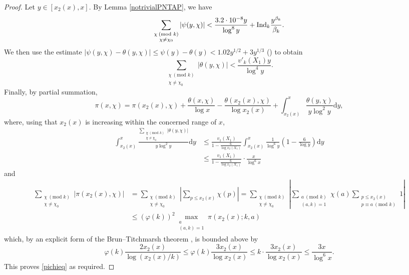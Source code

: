 \documentclass[12pt]{amsart}
\begin{document}
\begin{proof}
Let $y\in [x_2(x),x]$. By Lemma \ref{notrivialPNTAP}, we have
\begin{equation*}
    \sum_{\substack{\chi\: (\text{mod }k) \\ \chi \ne \chi_0}} \left|\psi(y,\chi)\right|<\frac{3.2\cdot 10^{-8}y}{\log^{8} y}+\textnormal{Ind}_k \frac{y^{\beta_k}}{\beta_k}.
\end{equation*}
We then use the estimate $\left|\psi(y, \chi)-\theta(y, \chi)\right|\le \psi(y)-\theta(y)<1.02y^{1/2}+3y^{1/3}$ (\cite[(3.39)]{R-S}) to obtain 
\begin{equation*}
    \sum_{\substack{\chi\: (\text{mod }k) \\ \chi \ne \chi_0}}\left|\theta(y,\chi)\right|<  \frac{v'_k(X_1)y}{\log^{4} y}.
\end{equation*}
Finally, by partial summation,
\begin{equation*}
\pi(x, \chi)=\pi(x_2(x), \chi)+\frac{\theta(x, \chi)}{\log x}-\frac{\theta(x_2(x), \chi)}{\log x_2(x)}+\int_{x_2(x)}^{x} \frac{\theta(y, \chi)}{y\log^2 y}\mathrm{d}y,
\end{equation*}
where,  using that $x_2(x)$ is increasing within the concerned range of $x$,
\begin{align*}
\int_{x_2(x)}^{x} \frac{\sum_{\substack{\chi\: (\text{mod }k) \\ \chi \ne \chi_0}}\left|\theta(y,\chi)\right|}{y\log^2 y}\mathrm{d}y & \le \frac{v_1(X_1)}{1-\frac{6}{\log x_2(X_1)}}\int_{x_2(x)}^{x}\frac{1}{\log^6 y}\left(1-\frac{6}{\log y}\right)\mathrm{d}y\\ &\le\frac{v_1(X_1)}{1-\frac{6}{\log x_2(X_1)}}\cdot\frac{x}{\log^6 x}
\end{align*}
and
\begin{align*}
    \sum_{\substack{\chi\: (\text{mod }k) \\ \chi \ne \chi_0}}\left|\pi(x_2(x),\chi)\right|&=\sum_{\substack{\chi\: (\text{mod }k) \\ \chi \ne \chi_0}}\left|\sum_{p\le x_2(x)}\chi(p)\right|=\sum_{\substack{\chi\: (\text{mod }k) \\ \chi \ne \chi_0}}\left|\sum_{\substack{a\: (\text{mod }k)\\(a,k)=1}}\chi(a)\sum_{\substack{p\le x_2(x)\\p\equiv a\:(\text{mod }k)}}1\right|\\ &\le (\varphi(k))^2\max_{\substack{a\\(a,k)=1}}\pi(x_2(x);k,a)
\end{align*}
which, by an explicit form of the Brun--Titchmarsh theorem \cite[Theorem 2]{M-V}, is bounded above by 
\begin{equation*}
    \varphi(k)\frac{2x_2(x)}{\log (x_2(x)/k)}\le \varphi(k)\frac{3x_2(x)}{\log x_2(x)}\le k\cdot \frac{3x_2(x)}{\log x_2(x)}\le\frac{3x}{\log^6 x}.    
\end{equation*}
This proves \eqref{pichieq} as required.
\end{proof}
\end{document}

